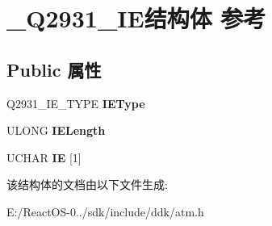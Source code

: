 \hypertarget{struct___q2931___i_e}{}\section{\+\_\+\+Q2931\+\_\+\+I\+E结构体 参考}
\label{struct___q2931___i_e}
\subsection*{Public 属性}
\begin{DoxyCompactItemize}
\item 
\mbox{\label{struct___q2931___i_e_a29770b5396ab6721c5960238da3576fa}} 
Q2931\+\_\+\+I\+E\+\_\+\+T\+Y\+PE {\bfseries I\+E\+Type}
\item 
\mbox{\label{struct___q2931___i_e_ac0810f476415790374b7c962ec244e60}} 
U\+L\+O\+NG {\bfseries I\+E\+Length}
\item 
\mbox{\label{struct___q2931___i_e_aa2dd094c6ef423530855e607ca7ef823}} 
U\+C\+H\+AR {\bfseries IE} \mbox{[}1\mbox{]}
\end{DoxyCompactItemize}


该结构体的文档由以下文件生成\+:\begin{DoxyCompactItemize}
\item 
E\+:/\+React\+O\+S-\/0../sdk/include/ddk/atm.\+h\end{DoxyCompactItemize}

